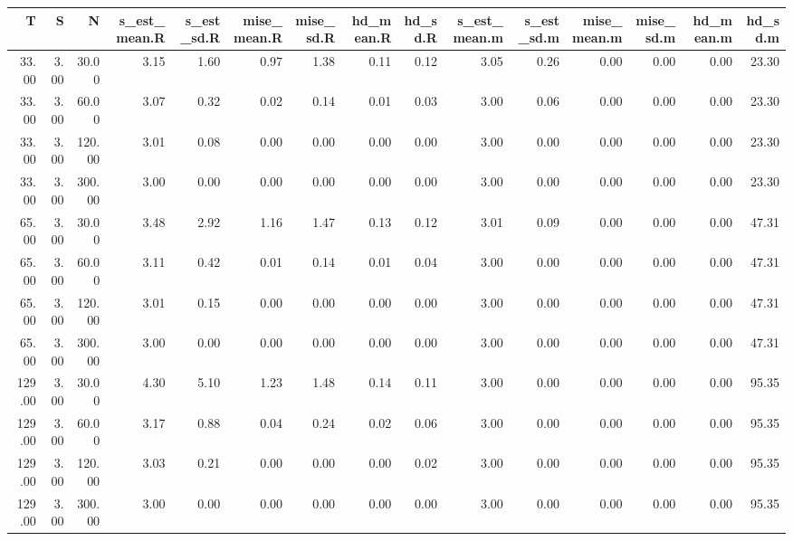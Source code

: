 \begin{table}[ht]
\centering
\begin{tabular}{rrrrrrrrrrrrrrr}
  \hline
T & S & N & s\_est\_mean.R & s\_est\_sd.R & mise\_mean.R & mise\_sd.R & hd\_mean.R & hd\_sd.R & s\_est\_mean.m & s\_est\_sd.m & mise\_mean.m & mise\_sd.m & hd\_mean.m & hd\_sd.m \\ 
  \hline
33.00 & 3.00 & 30.00 & 3.15 & 1.60 & 0.97 & 1.38 & 0.11 & 0.12 & 3.05 & 0.26 & 0.00 & 0.00 & 0.00 & 23.30 \\ 
  33.00 & 3.00 & 60.00 & 3.07 & 0.32 & 0.02 & 0.14 & 0.01 & 0.03 & 3.00 & 0.06 & 0.00 & 0.00 & 0.00 & 23.30 \\ 
  33.00 & 3.00 & 120.00 & 3.01 & 0.08 & 0.00 & 0.00 & 0.00 & 0.00 & 3.00 & 0.00 & 0.00 & 0.00 & 0.00 & 23.30 \\ 
  33.00 & 3.00 & 300.00 & 3.00 & 0.00 & 0.00 & 0.00 & 0.00 & 0.00 & 3.00 & 0.00 & 0.00 & 0.00 & 0.00 & 23.30 \\ 
  65.00 & 3.00 & 30.00 & 3.48 & 2.92 & 1.16 & 1.47 & 0.13 & 0.12 & 3.01 & 0.09 & 0.00 & 0.00 & 0.00 & 47.31 \\ 
  65.00 & 3.00 & 60.00 & 3.11 & 0.42 & 0.01 & 0.14 & 0.01 & 0.04 & 3.00 & 0.00 & 0.00 & 0.00 & 0.00 & 47.31 \\ 
  65.00 & 3.00 & 120.00 & 3.01 & 0.15 & 0.00 & 0.00 & 0.00 & 0.00 & 3.00 & 0.00 & 0.00 & 0.00 & 0.00 & 47.31 \\ 
  65.00 & 3.00 & 300.00 & 3.00 & 0.00 & 0.00 & 0.00 & 0.00 & 0.00 & 3.00 & 0.00 & 0.00 & 0.00 & 0.00 & 47.31 \\ 
  129.00 & 3.00 & 30.00 & 4.30 & 5.10 & 1.23 & 1.48 & 0.14 & 0.11 & 3.00 & 0.00 & 0.00 & 0.00 & 0.00 & 95.35 \\ 
  129.00 & 3.00 & 60.00 & 3.17 & 0.88 & 0.04 & 0.24 & 0.02 & 0.06 & 3.00 & 0.00 & 0.00 & 0.00 & 0.00 & 95.35 \\ 
  129.00 & 3.00 & 120.00 & 3.03 & 0.21 & 0.00 & 0.00 & 0.00 & 0.02 & 3.00 & 0.00 & 0.00 & 0.00 & 0.00 & 95.35 \\ 
  129.00 & 3.00 & 300.00 & 3.00 & 0.00 & 0.00 & 0.00 & 0.00 & 0.00 & 3.00 & 0.00 & 0.00 & 0.00 & 0.00 & 95.35 \\ 
   \hline
\end{tabular}
\end{table}
